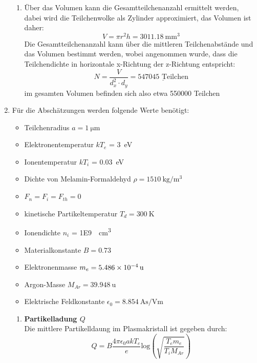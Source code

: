\documentclass[12pt,a4paper,ngerman]{article}
\begin{document}
\begin{enumerate}[font=\bfseries]
\begin{enumerate}[font=\bfseries, label=\alph*)]
	\item Über das Volumen kann die Gesamtteilchenanzahl ermittelt werden, dabei wird die Teilchenwolke als Zylinder approximiert, das Volumen ist daher:
	\begin{equation}
		V = \pi r^2 h = \SI{3011.18}{\milli \meter \cubed}
	\end{equation} 
	Die Gesamtteilchenanzahl kann über die mittleren Teilchenabstände und das Volumen bestimmt werden, wobei angenommen wurde, dass die Teilchendichte in horizontale x-Richtung der z-Richtung entspricht:
	\begin{equation}
		N = \frac{V}{d_x^2 \cdot d_y} = \underline{ 547045 \, \,\text{Teilchen}}
	\end{equation}
	im gesamten Volumen befinden sich also etwa 550000 Teilchen
	\end{enumerate}
		\item 	Für die Abschätzungen werden folgende Werte benötigt:
		\begin{itemize}
			\item Teilchenradius $a = \SI{1}{\micro \meter}$
			\item Elektronentemperatur $kT_e$ = \SI{3}{\eV}
			\item Ionentemperatur $kT_i$ = \SI{0.03}{\eV}
			\item Dichte von Melamin-Formaldehyd $\rho = \SI{1510}{\kilogram \per \meter \cubed}$
			\item $F_n = F_i = F_{th} = 0$
			\item kinetische Partikeltemperatur $T_d = \SI{300}{\kelvin}$
			\item Ionendichte $n_i$ = \SI{1E9}{\per \centi \meter \cubed}
			\item Materialkonstante $B = 0.73$
			\item Elektronenmasse $m_e = \SI{5.486E-4}{\atomicmassunit}$
			\item Argon-Masse $M_{Ar} = \SI{39.948}{\atomicmassunit}$
			\item Elektrische Feldkonstante $\epsilon_0 = \SI{8.854}{\ampere \second \per \volt \meter}$
		\end{itemize}
	\begin{enumerate}[font=\bfseries, label=\alph*)]
			\item \textbf{Partikelladung $Q$}\\
			 Die mittlere Partikelldaung im Plasmakristall ist gegeben durch:
			\begin{equation}
				Q = B \frac{4 \pi \epsilon_0 a k T_e}{e} \text{log}\left(\sqrt{\frac{T_e m_e}{T_i M_{Ar}}}\right)

\end{equation}
\end{enumerate}
\end{enumerate}
\end{document}
